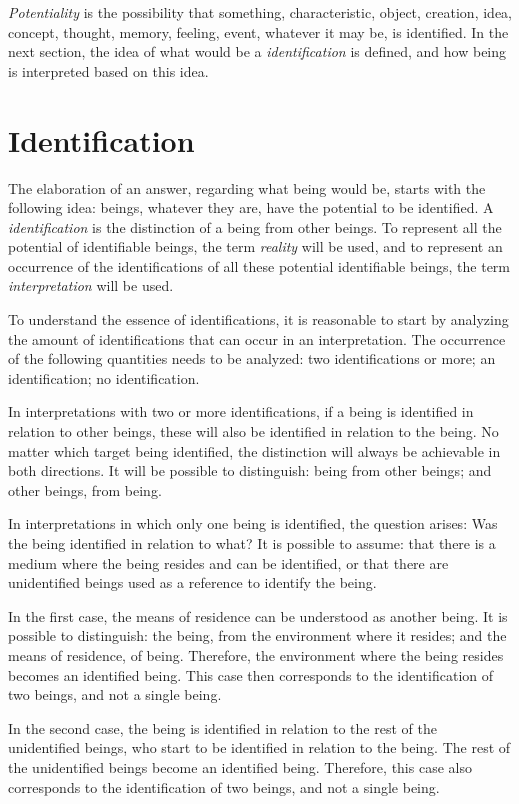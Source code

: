 \documentclass[11pt]{article}
\begin{document}
	\textit {Potentiality} is the possibility that something, characteristic, object, creation, idea, concept, thought, memory, feeling, event, whatever it may be, is identified. In the next section, the idea of what would be a \textit {identification} is defined, and how being is interpreted based on this idea. 
	
	\section{Identification} \label{pt-s3}
	
	The elaboration of an answer, regarding what being would be, starts with the following idea: beings, whatever they are, have the potential to be identified. A \textit{identification} is the distinction of a being from other beings. To represent all the potential of identifiable beings, the term \textit{reality} will be used, and to represent an occurrence of the identifications of all these potential identifiable beings, the term \textit{interpretation} will be used.
	
	To understand the essence of identifications, it is reasonable to start by analyzing the amount of identifications that can occur in an interpretation. The occurrence of the following quantities needs to be analyzed: two identifications or more; an identification; no identification.
	
	In interpretations with two or more identifications, if a being is identified in relation to other beings, these will also be identified in relation to the being. No matter which target being identified, the distinction will always be achievable in both directions. It will be possible to distinguish: being from other beings; and other beings, from being.
	
	In interpretations in which only one being is identified, the question arises: Was the being identified in relation to what? It is possible to assume: that there is a medium where the being resides and can be identified, or that there are unidentified beings used as a reference to identify the being.
	
	In the first case, the means of residence can be understood as another being. It is possible to distinguish: the being, from the environment where it resides; and the means of residence, of being. Therefore, the environment where the being resides becomes an identified being. This case then corresponds to the identification of two beings, and not a single being. 
	
	In the second case, the being is identified in relation to the rest of the unidentified beings, who start to be identified in relation to the being. The rest of the unidentified beings become an identified being. Therefore, this case also corresponds to the identification of two beings, and not a single being.
	
\end{document}
